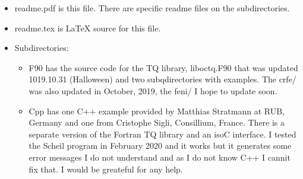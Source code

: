 \documentclass[12pt]{article}
\begin{document}
\begin{itemize}
\item readme.pdf is this file.  There are specific readme files on the
  subdirectories.

\item readme.tex is LaTeX source for this file.

\item Subdirectories:
  \begin{itemize}
  \item F90 has the source code for the TQ library, liboctq.F90 that
    was updated 1019.10.31 (Halloween) and two subqdirectories with
    examples.  The crfe/ was also updated in October, 2019, the feni/
    I hope to update soon.

  \item Cpp has one C++ example provided by Matthias Stratmann at RUB,
    Germany and one from Cristophe Sigli, Consillium, France.  There
    is a separate version of the Fortran TQ library and an isoC
    interface.  I tested the Scheil program in February 2020 and it works
    but it generates some error messages I do not understand and as I
    do not know C++ I cannit fix that.  I would be greateful for any help.
  \end{itemize}
\end{itemize}
\end{document}
